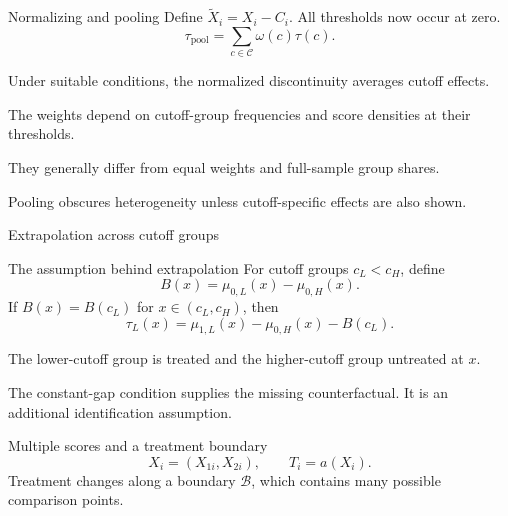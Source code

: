 \begin{frame}{Normalizing and pooling}
Define $\widetilde X_i=X_i-C_i$. All thresholds now occur at zero.
\[
\tau_{\mathrm{pool}}=\sum_{c\in\mathcal C}\omega(c)\tau(c).
\]
\begin{items}
\item Under suitable conditions, the normalized discontinuity averages cutoff effects.
\item The weights depend on cutoff-group frequencies and score densities at their thresholds.
\item They generally differ from equal weights and full-sample group shares.
\item Pooling obscures heterogeneity unless cutoff-specific effects are also shown.
\end{items}
\end{frame}

\begin{frame}{Extrapolation across cutoff groups}
\end{frame}

\begin{frame}{The assumption behind extrapolation}
For cutoff groups $c_L<c_H$, define
\[
B(x)=\mu_{0,L}(x)-\mu_{0,H}(x).
\]
If $B(x)=B(c_L)$ for $x\in(c_L,c_H)$, then
\[
\tau_L(x)=\mu_{1,L}(x)-\mu_{0,H}(x)-B(c_L).
\]
\begin{items}
\item The lower-cutoff group is treated and the higher-cutoff group untreated at $x$.
\item The constant-gap condition supplies the missing counterfactual. It is an additional identification assumption.
\end{items}
\end{frame}

\begin{frame}{Multiple scores and a treatment boundary}
\[
X_i=(X_{1i},X_{2i}),\qquad T_i=a(X_i).
\]
Treatment changes along a boundary $\mathcal B$, which contains many possible comparison points.
\end{frame}

